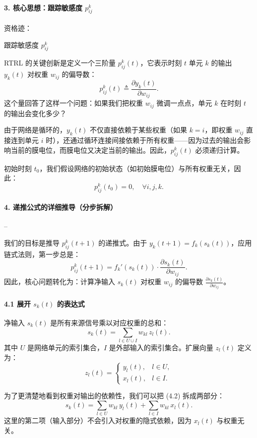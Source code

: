 \documentclass[journal,12pt,onecolumn]{IEEEtran}
\begin{document}
\paragraph{3. 核心思想：跟踪敏感度 \(p_{ij}^k\)}

资格迹：

跟踪敏感度 \(p_{ij}^k\)


RTRL 的关键创新是定义一个三阶量 \(p_{ij}^k(t)\)，它表示时刻 \(t\) 单元 \(k\) 的输出 \(y_k(t)\) 对权重 \(w_{ij}\) 的偏导数：
\[
p_{ij}^k(t) \triangleq \frac{\partial y_k(t)}{\partial w_{ij}}.
\]
这个量回答了这样一个问题：如果我们把权重 \(w_{ij}\) 微调一点点，单元 \(k\) 在时刻 \(t\) 的输出会变化多少？

由于网络是循环的，\(y_k(t)\) 不仅直接依赖于某些权重（如果 \(k=i\)，即权重 \(w_{ij}\) 直接连到单元 \(i\) 时），还通过循环连接间接依赖于所有权重——因为过去的输出会影响当前的膜电位，而膜电位又决定当前的输出。因此，\(p_{ij}^k(t)\) 必须递归计算。

初始时刻 \(t_0\)，我们假设网络的初始状态（如初始膜电位）与所有权重无关，因此：
\[
p_{ij}^k(t_0) = 0, \quad \forall i,j,k.
\]

\paragraph{4. 递推公式的详细推导（分步拆解）}

--


我们的目标是推导 \(p_{ij}^k(t+1)\) 的递推式。由于 \(y_k(t+1) = f_k(s_k(t))\)，应用链式法则，第一步总是：
\[
p_{ij}^k(t+1) = f_k'(s_k(t)) \cdot \frac{\partial s_k(t)}{\partial w_{ij}}. \tag{4.1}
\]
因此，核心问题转化为：计算净输入 \(s_k(t)\) 对权重 \(w_{ij}\) 的偏导数 \(\frac{\partial s_k(t)}{\partial w_{ij}}\)。

\paragraph{4.1 展开 \(s_k(t)\) 的表达式}

净输入 \(s_k(t)\) 是所有来源信号乘以对应权重的总和：
\[
s_k(t) = \sum_{l \in U \cup I} w_{kl} \, z_l(t). \tag{4.2}
\]
其中 \(U\) 是网络单元的索引集合，\(I\) 是外部输入的索引集合。扩展向量 \(z_l(t)\) 定义为：
\[
z_l(t) = 
\begin{cases}
y_l(t), & l \in U, \\
x_l(t), & l \in I.
\end{cases}
\]

为了更清楚地看到权重对输出的依赖性，我们可以把 (4.2) 拆成两部分：
\[
s_k(t) = \sum_{l \in U} w_{kl} \, y_l(t) + \sum_{l \in I} w_{kl} \, x_l(t). \tag{4.3}
\]
这里的第二项（输入部分）不会引入对权重的隐式依赖，因为 \(x_l(t)\) 与权重无关。
\end{document}
